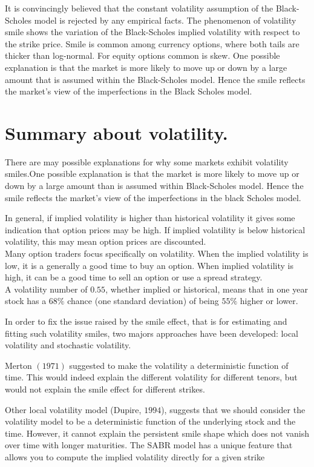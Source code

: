 \documentclass{book}
\begin{document}
It is convincingly believed that the constant volatility assumption of the Black-Scholes model is rejected by any empirical facts. 
The phenomenon of volatility smile shows the variation of the Black-Scholes implied volatility with respect to the strike price. Smile is common among currency options, where both tails are thicker than log-normal. For equity options common is skew. One possible explanation is that the market is more likely to move up or down by a large amount that is assumed within the Black-Scholes model. Hence the smile reflects the market's view of the imperfections in the Black Scholes model.
\section{Summary about volatility.}
There are may possible explanations for why some markets exhibit volatility smiles.One possible explanation is that the market is more likely to move up or down by a large amount than is assumed within Black-Scholes model. Hence the smile reflects the market's view of the imperfections in the black Scholes model.

In general, if implied volatility is higher than historical volatility it gives some indication that option prices may be high. If implied volatility is below historical volatility, this may mean option prices are discounted.\\
Many option traders focus specifically on volatility. When the implied volatility is low, it is a generally a good time to buy an option. When implied volatility is high, it can be a good time to sell an option or use a spread strategy.\\
 A volatility number of $0.55$, whether implied or historical, means that in one year stock has a $68\%$ chance (one standard deviation) of being $55\%$ higher or lower.

In order to fix the issue raised by the smile effect, that is for estimating and fitting such volatility smiles, two majors approaches have been developed: local volatility and stochastic volatility.

Merton $(1971)$ suggested to make the volatility a deterministic function of time. This would indeed explain the different volatility for different tenors, but would not explain the smile effect for different strikes.

Other local volatility model (Dupire, $1994$), suggests that we should consider the volatility model to be a deterministic function of the underlying stock and the time. However, it cannot explain the persistent smile shape which does not vanish over time with longer maturities.
The SABR model has a unique feature that allows you to compute the implied volatility directly for a given strike
\end{document}
